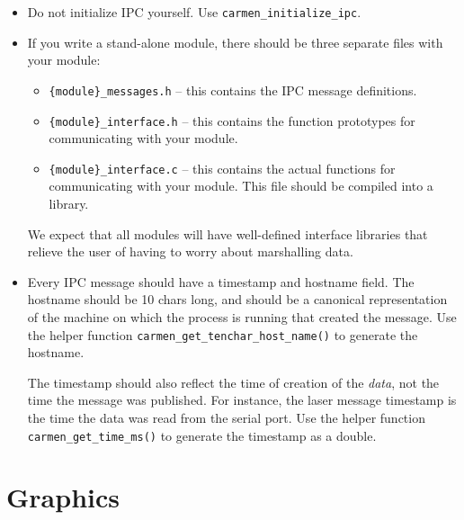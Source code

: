 \documentclass{article}
\begin{document}
\begin{itemize}

\item Do not initialize IPC yourself. Use \verb!carmen_initialize_ipc!. 

\item If you write a stand-alone module, there should be three separate files
  with your module:
  \begin{itemize}
  \item \verb!{module}_messages.h! -- this contains the IPC message
    definitions.
  \item \verb!{module}_interface.h! -- this contains the function prototypes
  for communicating with your module.
  \item \verb!{module}_interface.c! -- this contains the actual functions
  for communicating with your module. This file should be compiled into a
  library. 
  \end{itemize}

  We expect that all modules will have well-defined interface libraries that
  relieve the user of having to worry about marshalling data.

\item Every IPC message should have a timestamp and hostname field. The
hostname should be 10 chars long, and should be a canonical representation of
the machine on which the process is running that created the message. Use the
helper function \verb!carmen_get_tenchar_host_name()! to generate the
hostname. 

The timestamp should also reflect the time of creation of the \emph{data}, not
the time the message was published. For instance, the laser message timestamp
is the time the data was read from the serial port. Use the helper function
\verb!carmen_get_time_ms()! to generate the timestamp as a double.

\end{itemize}

\section{Graphics}
\end{document}
